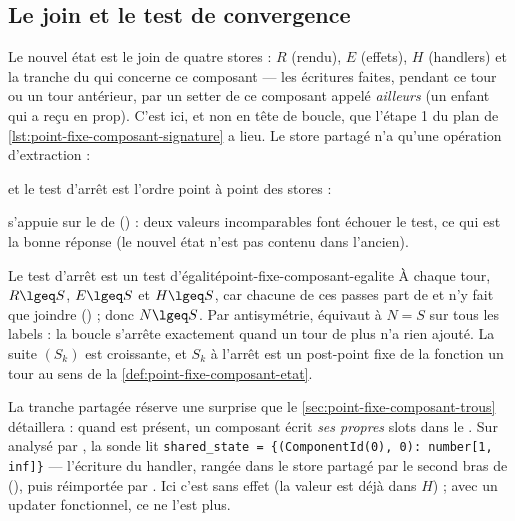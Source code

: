\subsection{Le join et le test de convergence}
\label{sec:point-fixe-composant-join}


Le nouvel état est le join de quatre stores : $R$ (rendu), $E$ (effets),
$H$ (handlers) et la tranche du  qui concerne ce
composant --- les écritures faites, pendant ce tour ou un tour antérieur,
par un setter de ce composant appelé \emph{ailleurs} (un enfant qui a reçu
 en prop). C'est ici, et non en tête de boucle, que
l'étape 1 du plan de \cref{lst:point-fixe-composant-signature} a lieu.
Le store partagé n'a qu'une opération d'extraction :


et le test d'arrêt est l'ordre point à point des stores :


 s'appuie sur le  de 
() : deux valeurs incomparables font échouer le test, ce
qui est la bonne réponse (le nouvel état n'est pas contenu dans l'ancien).

\begin{proposition}{Le test d'arrêt est un test d'égalité}{point-fixe-composant-egalite}
À chaque tour, $R \lgeq S$, $E \lgeq S$ et $H \lgeq S$, car chacune de ces
passes part de  et n'y fait que joindre
() ; donc $N \lgeq S$. Par
antisymétrie,  équivaut à $N = S$ sur tous les
labels : la boucle s'arrête exactement quand un tour de plus n'a rien
ajouté. La suite $(S_k)$ est croissante, et $S_k$ à l'arrêt est un
post-point fixe de la fonction \og un tour\fg{} au sens de la
\cref{def:point-fixe-composant-etat}.
\end{proposition}

La tranche partagée réserve une surprise que le \cref{sec:point-fixe-composant-trous}
détaillera : quand  est présent, un composant écrit \emph{ses
propres} slots dans le . Sur  analysé
par , la sonde lit
\texttt{shared\_state = \{(ComponentId(0), 0): number[1, inf]\}} --- l'écriture
du handler, rangée dans le store partagé par le second bras de
 (),
puis réimportée par . Ici c'est sans effet (la valeur est déjà
dans $H$) ; avec un updater fonctionnel, ce ne l'est plus.

